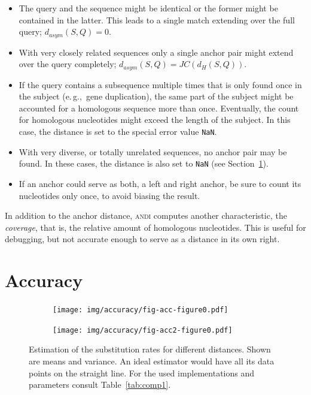 \documentclass[a4paper,
  10pt,
  english,
  DIV=12,
  BCOR=8mm]{scrbook}
\newcommand{\algo}[1]{\textsc{{#1}}}
\newcommand{\andi}{\algo{andi} }
\begin{document}
\begin{itemize}
\item The query and the sequence might be identical or the former might be contained in the latter. This leads to a single match extending over the full query; $d_{asym}(S,Q) = 0$.
\item With very closely related sequences only a single anchor pair might extend over the query completely; $d_{asym}(S,Q) = \mathit{JC}(d_H(S,Q))$.
\item If the query contains a subsequence multiple times that is only found once in the subject (e.\,g.,\ gene duplication), the same part of the subject might be accounted for a homologous sequence more than once. Eventually, the count for homologous nucleotides might exceed the length of the subject. In this case, the distance is set to the special error value \texttt{NaN}.
\item With very diverse, or totally unrelated sequences, no anchor pair may be found. In these cases, the distance is also set to \texttt{NaN} (see Section~\ref{sec:accuracy}).
\item If an anchor could serve as both, a left and right anchor, be sure to count its nucleotides only once, to avoid biasing the result.
\end{itemize}

In addition to the anchor distance, \andi computes another characteristic, the \emph{coverage}, that is, the relative amount of homologous nucleotides. This is useful for debugging, but not accurate enough to serve as a distance in its own right.

\section{Accuracy}\label{sec:accuracy}

\begin{figure}
  \centering
  \begin{subfigure}{0.4\textwidth}
    \centering\texttt{[image: img/accuracy/fig-acc-figure0.pdf]}
  \end{subfigure}
  \quad
  \begin{subfigure}{0.4\textwidth}
    \centering\texttt{[image: img/accuracy/fig-acc2-figure0.pdf]}
  \end{subfigure}
  \caption[Accuracy Comparison]{\label{fig:acc} Estimation of the substitution rates for different distances. Shown are means and variance. An ideal estimator would have all its data points on the straight line. For the used implementations and parameters consult Table~\ref{tab:comp1}.}
\end{figure}
\end{document}
